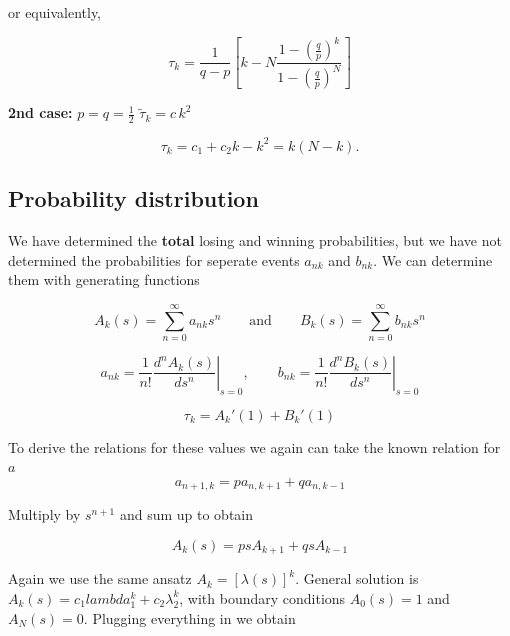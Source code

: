 or equivalently,

\begin{equation*}
\tau_k = \frac{1}{q - p} 
\left[ k - N \frac{1 - \left(\frac{q}{p}\right)^k}{1 - \left(\frac{q}{p}\right)^N} \right]
\end{equation*}


\textbf{2nd case:} $p = q = \tfrac{1}{2}$ \qquad $\tilde{\tau}_k = c\,k^2$

\begin{equation*}
\tau_k = c_1 + c_2 k - k^2 = k(N - k).    
\end{equation*}


\subsection{Probability distribution}

We have determined the \textbf{total} losing and winning probabilities, but we have not determined the probabilities for seperate events $a_{nk}$ and $b_{nk}$. We can determine them with generating functions

\begin{equation*}
    A_k (s) = \sum_{n=0}^{\infty} a_{nk} s^{n} \qquad \text{and} \qquad B_k(s) = \sum_{n=0}^{\infty} b_{nk} s^{n}
\end{equation*}

\begin{equation}
a_{nk}= \frac{1}{n!}\left.\frac{d^n A_k(s)}{ds^n} \right|_{s=0},
\qquad
b_{nk}= \frac{1}{n!} \left. \frac{d^n B_k(s)}{ds^n}\right|_{s=0}
\end{equation}

\begin{equation}
\tau_k = A_k'(1) + B_k'(1)
\end{equation}

To derive the relations for these values we again can take the known relation for $a$
\begin{equation*}
    a_{n+1,k} = pa_{n, k+1} + q a_{n, k-1}
\end{equation*}

Multiply by $s^{n+1}$ and sum up to obtain

\begin{equation*}
    A_k(s) = ps A_{k+1} + qs A_{k-1}
\end{equation*}

Again we use the same ansatz $A_{k} = [\lambda(s)]^k$. General solution is $A_k(s) = c_1 lambda_1^k + c_2 \lambda_2^{k}$, with boundary conditions $A_0(s) = 1$ and $A_N(s) = 0$. Plugging everything in we obtain

